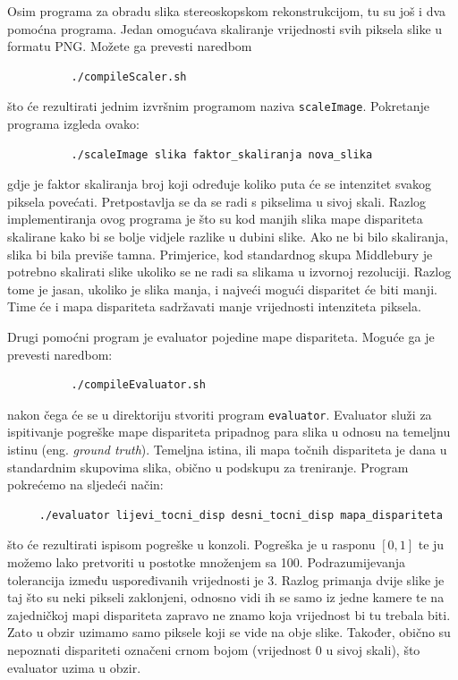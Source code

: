 \documentclass[utf8, zavrsni, numeric]{fer}
\begin{document}
Osim programa za obradu slika stereoskopskom rekonstrukcijom, tu su još i dva pomoćna programa. Jedan omogućava skaliranje vrijednosti svih piksela slike u formatu PNG. Možete ga prevesti
naredbom
\begin{verbatim}
          ./compileScaler.sh
\end{verbatim}
što će rezultirati jednim izvršnim programom naziva {\tt scaleImage}. Pokretanje programa
izgleda ovako:
\begin{verbatim}
          ./scaleImage slika faktor_skaliranja nova_slika
\end{verbatim}
gdje je faktor skaliranja broj koji određuje koliko puta će se intenzitet svakog piksela povećati. Pretpostavlja se da se radi s pikselima u sivoj skali. Razlog implementiranja ovog programa
je što su kod manjih slika mape dispariteta skalirane kako bi se bolje vidjele razlike u dubini slike. Ako ne bi bilo skaliranja, slika bi bila previše tamna. Primjerice, kod standardnog skupa Middlebury je potrebno skalirati slike ukoliko se ne radi sa slikama u izvornoj rezoluciji. Razlog tome je jasan, ukoliko je slika manja, i najveći mogući disparitet će biti manji.
Time će i mapa dispariteta sadržavati manje vrijednosti intenziteta piksela.

Drugi pomoćni program je evaluator pojedine mape dispariteta. Moguće ga je prevesti naredbom:
\begin{verbatim}
          ./compileEvaluator.sh
\end{verbatim}
nakon čega će se u direktoriju stvoriti program {\tt evaluator}. Evaluator služi za ispitivanje
pogreške mape dispariteta pripadnog para slika u odnosu na temeljnu istinu (eng. {\sl ground truth}). Temeljna istina, ili mapa točnih dispariteta je dana u standardnim skupovima slika, 
obično u podskupu za treniranje. Program pokrećemo na sljedeći način:
\begin{verbatim}
     ./evaluator lijevi_tocni_disp desni_tocni_disp mapa_dispariteta
\end{verbatim}
što će rezultirati ispisom pogreške u konzoli. Pogreška je u rasponu $[0, 1]$ te ju možemo lako pretvoriti u postotke množenjem sa 100. Podrazumijevanja tolerancija između uspoređivanih vrijednosti je 3. Razlog primanja dvije slike je taj što su neki
pikseli zaklonjeni, odnosno vidi ih se samo iz jedne kamere te na zajedničkoj mapi dispariteta
zapravo ne znamo koja vrijednost bi tu trebala biti. Zato u obzir uzimamo samo piksele koji se vide na obje slike.
Također, obično su nepoznati dispariteti označeni crnom bojom (vrijednost 0 u sivoj skali), što evaluator uzima u obzir.
\end{document}
